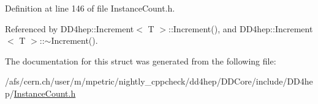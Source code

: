 Definition at line 146 of file InstanceCount.h.

Referenced by DD4hep::Increment$<$ T $>$::Increment(), and DD4hep::Increment$<$ T $>$::$\sim$Increment().

The documentation for this struct was generated from the following file:\begin{DoxyCompactItemize}
\item 
/afs/cern.ch/user/m/mpetric/nightly\_\-cppcheck/dd4hep/DDCore/include/DD4hep/\hyperlink{_instance_count_8h}{InstanceCount.h}\end{DoxyCompactItemize}
